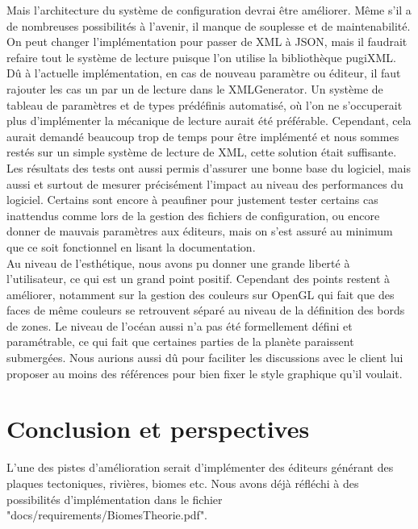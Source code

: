 \documentclass[a4paper]{article}
\begin{document}
Mais l'architecture du système de configuration devrai être améliorer. Même s'il a de nombreuses possibilités à l'avenir, il manque de souplesse et de maintenabilité. On peut changer l'implémentation pour passer de XML à JSON, mais il faudrait refaire tout le système de lecture puisque l'on utilise la bibliothèque pugiXML. Dû à l'actuelle implémentation, en cas de nouveau paramètre ou éditeur, il faut rajouter les cas un par un de lecture dans le XMLGenerator. Un système de tableau de paramètres et de types prédéfinis automatisé, où l'on ne s'occuperait plus d'implémenter la mécanique de lecture aurait été préférable. Cependant, cela aurait demandé beaucoup trop de temps pour être implémenté et nous sommes restés sur un simple système de lecture de XML, cette solution était suffisante. \\

Les résultats des tests ont aussi permis d'assurer une bonne base du logiciel, mais aussi et surtout de mesurer précisément l'impact au niveau des performances du logiciel. Certains sont encore à peaufiner pour justement tester certains cas inattendus comme lors de la gestion des fichiers de configuration, ou encore donner de mauvais paramètres aux éditeurs, mais on s'est assuré au minimum que ce soit fonctionnel en lisant la documentation.\\

Au niveau de l'esthétique, nous avons pu donner une grande liberté à l'utilisateur, ce qui est un grand point positif. Cependant des points restent à améliorer, notamment sur la gestion des couleurs sur OpenGL qui fait que des faces de même couleurs se retrouvent séparé au niveau de la définition des bords de zones. Le niveau de l'océan aussi n'a pas été formellement défini et paramétrable, ce qui fait que certaines parties de la planète paraissent submergées. Nous aurions aussi dû pour faciliter les discussions avec le client lui proposer au moins des références pour bien fixer le style graphique qu'il voulait.\\

\newpage
\section{Conclusion et perspectives}

L'une des pistes d'amélioration serait d'implémenter des éditeurs générant des plaques tectoniques, rivières, biomes etc. Nous avons déjà réfléchi à des possibilités d'implémentation dans le fichier "docs/requirements/BiomesTheorie.pdf". \\
\end{document}
